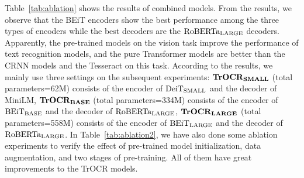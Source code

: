 \documentclass[letterpaper]{article} \usepackage{aaai23}  \usepackage{times}  \usepackage{helvet}  \usepackage{courier}  \usepackage[hyphens]{url}  \usepackage{graphicx} \urlstyle{rm} \def\UrlFont{\rm}  \usepackage{natbib}  \usepackage{caption} \frenchspacing  \setlength{\pdfpagewidth}{8.5in} \setlength{\pdfpageheight}{11in} \usepackage{algorithm}
\begin{document}
Table~\ref{tab:ablation} shows the results of combined models. From the results, we observe that the BEiT encoders show the best performance among the three types of encoders while the best decoders are the $\textrm{RoBERTa}_{\rm LARGE}$ decoders. Apparently, the pre-trained models on the vision task improve the performance of text recognition models, and the pure Transformer models are better than the CRNN models and the Tesseract on this task. According to the results, we mainly use three settings on the subsequent experiments: $\textbf{TrOCR}_{\bf SMALL}$ (total parameters=62M) consists of the encoder of $\textrm{DeiT}_{\rm SMALL}$ and the decoder of MiniLM, $\textbf{TrOCR}_{\bf BASE}$ (total parameters=334M) consists of the encoder of $\textrm{BEiT}_{\rm BASE}$ and the decoder of $\textrm{RoBERTa}_{\rm LARGE}$, $\textbf{TrOCR}_{\bf LARGE}$ (total parameters=558M) consists of the encoder of $\textrm{BEiT}_{\rm LARGE}$ and the decoder of $\textrm{RoBERTa}_{\rm LARGE}$. In Table~\ref{tab:ablation2}, we have also done some ablation experiments to verify the effect of pre-trained model initialization, data augmentation, and two stages of pre-training. All of them have great improvements to the TrOCR models.
\end{document}
